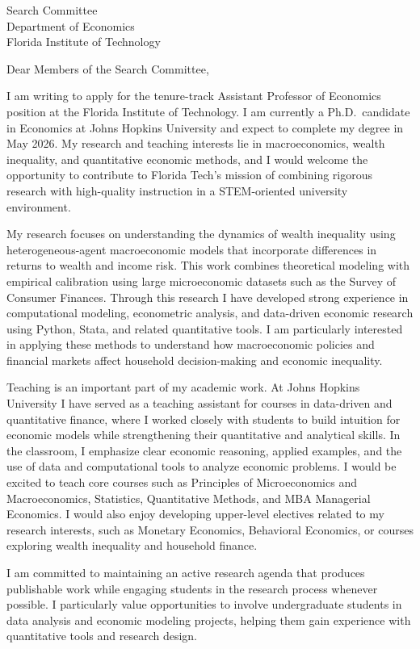\documentclass[11pt]{letter}
\begin{document}
\begin{letter}{Search Committee \\
Department of Economics \\
Florida Institute of Technology}

\opening{Dear Members of the Search Committee,}

I am writing to apply for the tenure-track Assistant Professor of Economics position at the Florida Institute of Technology. I am currently a Ph.D.\ candidate in Economics at Johns Hopkins University and expect to complete my degree in May 2026. My research and teaching interests lie in macroeconomics, wealth inequality, and quantitative economic methods, and I would welcome the opportunity to contribute to Florida Tech’s mission of combining rigorous research with high-quality instruction in a STEM-oriented university environment.

My research focuses on understanding the dynamics of wealth inequality using heterogeneous-agent macroeconomic models that incorporate differences in returns to wealth and income risk. This work combines theoretical modeling with empirical calibration using large microeconomic datasets such as the Survey of Consumer Finances. Through this research I have developed strong experience in computational modeling, econometric analysis, and data-driven economic research using Python, Stata, and related quantitative tools. I am particularly interested in applying these methods to understand how macroeconomic policies and financial markets affect household decision-making and economic inequality.

Teaching is an important part of my academic work. At Johns Hopkins University I have served as a teaching assistant for courses in data-driven and quantitative finance, where I worked closely with students to build intuition for economic models while strengthening their quantitative and analytical skills. In the classroom, I emphasize clear economic reasoning, applied examples, and the use of data and computational tools to analyze economic problems. I would be excited to teach core courses such as Principles of Microeconomics and Macroeconomics, Statistics, Quantitative Methods, and MBA Managerial Economics. I would also enjoy developing upper-level electives related to my research interests, such as Monetary Economics, Behavioral Economics, or courses exploring wealth inequality and household finance.

I am committed to maintaining an active research agenda that produces publishable work while engaging students in the research process whenever possible. I particularly value opportunities to involve undergraduate students in data analysis and economic modeling projects, helping them gain experience with quantitative tools and research design.


\end{letter}
\end{document}
